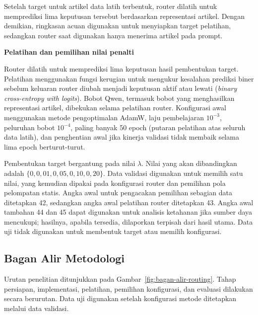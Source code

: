Setelah target untuk artikel data latih terbentuk, router dilatih untuk memprediksi lima keputusan tersebut berdasarkan representasi artikel. Dengan demikian, ringkasan acuan digunakan untuk menyiapkan target pelatihan, sedangkan router saat digunakan hanya menerima artikel pada prompt.

\medskip
\noindent\textbf{Pelatihan dan pemilihan nilai penalti}\par\smallskip

Router dilatih untuk memprediksi lima keputusan hasil pembentukan target. Pelatihan menggunakan fungsi kerugian untuk mengukur kesalahan prediksi biner sebelum keluaran router diubah menjadi keputusan aktif atau lewati (\textit{binary cross-entropy with logits}). Bobot Qwen, termasuk bobot yang menghasilkan representasi artikel, dibekukan selama pelatihan router. Konfigurasi awal menggunakan metode pengoptimalan AdamW, laju pembelajaran $10^{-3}$, peluruhan bobot $10^{-4}$, paling banyak 50 epoch (putaran pelatihan atas seluruh data latih), dan penghentian awal jika kinerja validasi tidak membaik selama lima epoch berturut-turut.

Pembentukan target bergantung pada nilai $\lambda$. Nilai yang akan dibandingkan adalah $\{0, 0{,}01, 0{,}05, 0{,}10, 0{,}20\}$. Data validasi digunakan untuk memilih satu nilai, yang kemudian dipakai pada konfigurasi router dan pemilihan pola pelompatan statis. Angka awal untuk pengacakan pemilihan sebagian data ditetapkan 42, sedangkan angka awal pelatihan router ditetapkan 43. Angka awal tambahan 44 dan 45 dapat digunakan untuk analisis ketahanan jika sumber daya mencukupi; hasilnya, apabila tersedia, dilaporkan terpisah dari hasil utama. Data uji tidak digunakan untuk membentuk target atau memilih konfigurasi.

\subsection{Bagan Alir Metodologi}

Urutan penelitian ditunjukkan pada Gambar~\ref{fig:bagan-alir-routing}. Tahap persiapan, implementasi, pelatihan, pemilihan konfigurasi, dan evaluasi dilakukan secara berurutan. Data uji digunakan setelah konfigurasi metode ditetapkan melalui data validasi.


